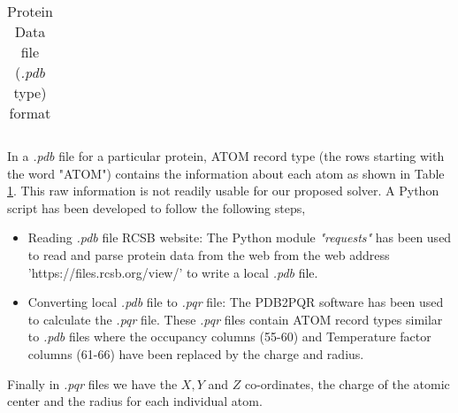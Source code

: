 \begin{table}[!t]
\begin{tabular}{|l|l|l|l|l|}
\end{tabular}
\caption{Protein Data file (\textit{.pdb} type) format}
\label{tab:PDB_format}
\end{table}

 In a \textit{.pdb} file for a particular protein, ATOM record type (the rows starting with the word "ATOM") contains the information about each atom as shown in Table \ref{tab:PDB_format}. This raw information is not readily usable for our proposed solver. A Python script has been developed to follow the following steps,


\begin{itemize}
 	\item Reading \textit{.pdb} file RCSB website: The Python module \textit{"requests"} has been used to read and parse protein data from the web from the web address 'https://files.rcsb.org/view/' to write a local \textit{.pdb} file. 
	\item Converting  local \textit{.pdb} file to \textit{.pqr} file: The PDB2PQR software \cite{PDB2PQR} has been used to calculate the {\it .pqr} file. These \textit{.pqr} files contain ATOM record types similar to \textit{.pdb} files where the occupancy columns (55-60) and Temperature factor columns (61-66) have been replaced by the charge and radius.     
 \end{itemize}

Finally in \textit{.pqr} files we have the $X,Y$ and $Z$ co-ordinates, the charge of the atomic center and the radius for each individual atom.  